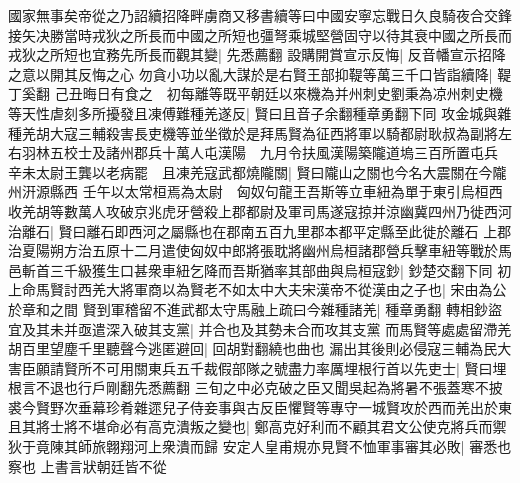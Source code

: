 國家無事矣帝從之乃詔續招降畔虜商又移書續等曰中國安寧忘戰日久良騎夜合交鋒接矢决勝當時戎狄之所長而中國之所短也彊弩乘城堅營固守以待其衰中國之所長而戎狄之所短也宜務先所長而觀其變|{
	先悉薦翻}
設購開賞宣示反悔|{
	反音幡宣示招降之意以開其反悔之心}
勿貪小功以亂大謀於是右賢王部抑鞮等萬三千口皆詣續降|{
	鞮丁奚翻}
己丑晦日有食之　初每離等既平朝廷以來機為并州刺史劉秉為凉州刺史機等天性虐刻多所擾發且凍傅難種羌遂反|{
	賢曰且音子余翻種章勇翻下同}
攻金城與雜種羌胡大寇三輔殺害長吏機等並坐徵於是拜馬賢為征西將軍以騎都尉耿叔為副將左右羽林五校士及諸州郡兵十萬人屯漢陽　九月令扶風漢陽築隴道塢三百所置屯兵　辛未太尉王龔以老病罷　且凍羌寇武都燒隴關|{
	賢曰隴山之關也今名大震關在今隴州汧源縣西}
壬午以太常桓焉為太尉　匈奴句龍王吾斯等立車紐為單于東引烏桓西收羌胡等數萬人攻破京兆虎牙營殺上郡都尉及軍司馬遂寇掠并涼幽冀四州乃徙西河治離石|{
	賢曰離石即西河之屬縣也在郡南五百九里郡本都平定縣至此徙於離石}
上郡治夏陽朔方治五原十二月遣使匈奴中郎將張耽將幽州烏桓諸郡營兵擊車紐等戰於馬邑斬首三千級獲生口甚衆車紐乞降而吾斯猶率其部曲與烏桓寇鈔|{
	鈔楚交翻下同}
初上命馬賢討西羌大將軍商以為賢老不如太中大夫宋漢帝不從漢由之子也|{
	宋由為公於章和之間}
賢到軍稽留不進武都太守馬融上疏曰今雜種諸羌|{
	種章勇翻}
轉相鈔盜宜及其未并亟遣深入破其支黨|{
	并合也及其勢未合而攻其支黨}
而馬賢等處處留滯羌胡百里望塵千里聽聲今逃匿避回|{
	回胡對翻繞也曲也}
漏出其後則必侵寇三輔為民大害臣願請賢所不可用關東兵五千裁假部隊之號盡力率厲埋根行首以先吏士|{
	賢曰埋根言不退也行戶剛翻先悉薦翻}
三旬之中必克破之臣又聞吳起為將暑不張蓋寒不披裘今賢野次垂幕珍肴雜遝兒子侍妾事與古反臣懼賢等專守一城賢攻於西而羌出於東且其將士將不堪命必有高克潰叛之變也|{
	鄭高克好利而不顧其君文公使克將兵而禦狄于竟陳其師旅翺翔河上衆潰而歸}
安定人皇甫規亦見賢不恤軍事審其必敗|{
	審悉也察也}
上書言狀朝廷皆不從

